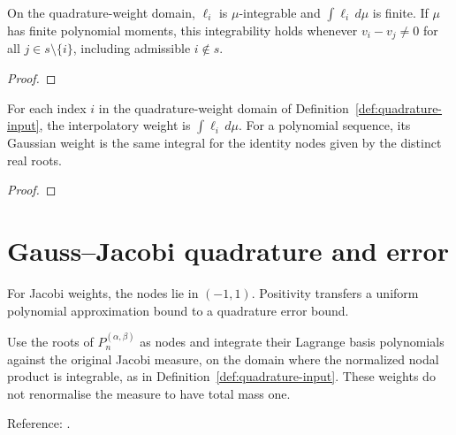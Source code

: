 \begin{supporting}

\begin{theorem}
\label{thm:quadrature-input}
\leanok
On the quadrature-weight domain, $\ell_i$ is $\mu$-integrable and
$\int\ell_i\,d\mu$ is finite.
If $\mu$ has finite polynomial moments, this integrability holds whenever
$v_i-v_j\ne0$ for all $j\in s\setminus\{i\}$, including admissible $i\notin s$.
\end{theorem}
\begin{proof}
\leanok
\end{proof}

\begin{theorem}
\label{thm:quadrature-weight-formulas}
\leanok
For each index $i$ in the quadrature-weight domain of Definition~\ref{def:quadrature-input}, the interpolatory weight is $\int\ell_i\,d\mu$.
For a polynomial sequence, its Gaussian weight is the same integral for
the identity nodes given by the distinct real roots.
\end{theorem}
\begin{proof}
\leanok
\end{proof}

\end{supporting}

\section{Gauss--Jacobi quadrature and error}\label{sec:textbook-gauss-jacobi}

For Jacobi weights, the nodes lie in $(-1,1)$. Positivity transfers a uniform polynomial approximation bound to a quadrature error bound.

\begin{definition}
\label{def:jacobi-gauss-weights}
\leanok
Use the roots of $P_n^{(\alpha,\beta)}$ as nodes and integrate their Lagrange
basis polynomials against the original Jacobi measure, on the domain where the normalized nodal product is integrable, as in Definition~\ref{def:quadrature-input}. These weights do not
renormalise the measure to have total mass one.

Reference: \cite[3.5(v)]{dlmf}.
\end{definition}

